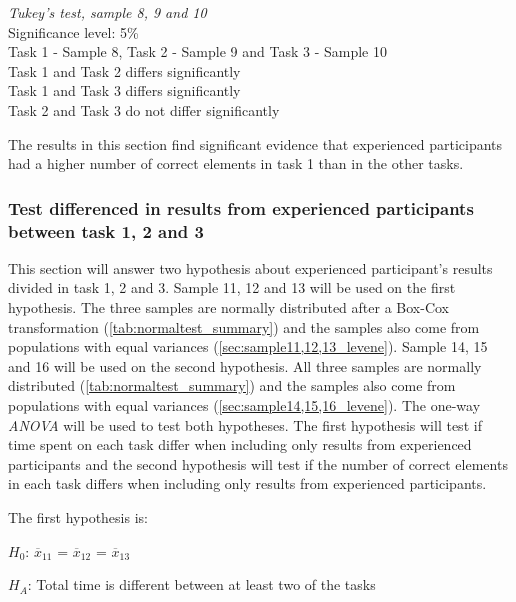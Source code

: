  \begin{center}
	\begin{tcolorbox}[width=0.8\textwidth]
		\centering
		\textit{Tukey's test, sample 8, 9 and 10}\\
		Significance level: 5\%  \\[0.5cm]
		Task 1 - Sample 8, Task 2 - Sample 9 and Task 3 - Sample 10 \\[0.5cm]
		
		Task 1 and Task 2 differs significantly \\
		Task 1 and Task 3 differs significantly \\
		Task 2 and Task 3 do not differ significantly \\[0.2cm]
	\end{tcolorbox} 
\end{center}

\vspace{0.3cm}

The results in this section find significant evidence that experienced participants had a higher number of correct elements in task 1 than in the other tasks. 

\subsubsection[Sample 11, 12 and 13]{Test differenced in results from experienced participants between task 1, 2 and 3}\label{sec:sample_11_12_13_anova}
This section will answer two hypothesis about experienced participant's results divided in task 1, 2 and 3. Sample 11, 12 and 13 will be used on the first hypothesis. The three samples are normally distributed after a Box-Cox transformation (\ref{tab:normaltest_summary}) and the samples also come from populations with equal variances (\ref{sec:sample11,12,13_levene}). Sample 14, 15 and 16 will be used on the second hypothesis. All three samples are normally distributed (\ref{tab:normaltest_summary}) and the samples also come from populations with equal variances (\ref{sec:sample14,15,16_levene}). The one-way \textit{ANOVA} will be used to test both hypotheses. The first hypothesis will test if time spent on each task differ when including only results from experienced participants and the second hypothesis will test if the number of correct elements in each task differs when including only results from experienced participants. 

The first hypothesis is:\\
\centerline{$H_{0}$: $\overline{x}_{11}$ = $\overline{x}_{12}$ = $\overline{x}_{13}$}
\centerline{$H_{A}$: Total time is different between at least two of the tasks}

